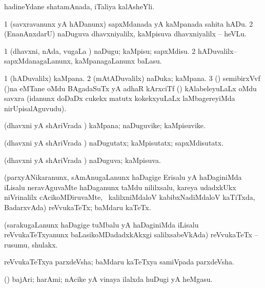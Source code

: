 \bentry
{}
\gl{\nA}
\bmng
hadineYdane shatamAnada, iTaliya kalAsheYli. 
\emng
\eentry

\bentry
{}
\gl{\sakirx}
\bmng
\bnum
\num{1} (savxravanunx yA hADanunx) sapxMdanada yA kaMpanada sahita hADu. 
\num{2} (EnanAnxdarU) naDuguva dhavxniyalilx, kaMpisuva dhavxniyalilx -- heVLu. 
\enum
\emng

\noindent
\gl{\akirx}
\bmng
\bnum
\num{1} (dhavxni, nAda, \mo vugaLa \vi) naDugu; kaMpisu; sapxMdisu. 
\num{2} hADuvalilx--sapxMdanagaLanunx, kaMpanagaLanunx baLasu. 
\enum
\emng
\eentry

\bentry
{}
\gl{\nA}
\bmng
\bnum
\num{1} (hADuvalilx) kaMpana. 
\num{2} (mAtADuvalilx) naDuka; kaMpana. 
\num{3} (\saM) semibirxVvf ()na eMTane oMdu BAgadaSuTx yA adhaR kArxciTf () kAlabeleyuLaLx oMdu savxra (idanunx doDaDx cukekx matutx kokekxyuLaLx laMbagereyiMda nirUpisalAguvudu). 
\enum
\emng
\eentry

\bentry
{}
\gl{\nA}
\bmng
(dhavxni yA shAriVrada \vi) kaMpana; naDuguvike; kaMpi\-suvike. 
\emng
\eentry

\bentry
{}
\gl{\kirxvi}
\bmng
(dhavxni yA shAriVrada \vi) naDugutatx; kaMpi\-sutatx; sapxMdisutatx. 
\emng
\eentry

\bentry
{}
\gl{\gu}
\bmng
(dhavxni yA shAriVrada \vi) naDuguva; kaMpisuva. 
\emng
\eentry

\bentry
{}
\gl{\nA}
\bmng
(parxyANikaranunx, sAmAnugaLanunx haDagige Erisalu yA haDaginiMda iLisalu neravAguvaMte haDaganunx taMdu nililxsalu, kareya udadxkUkx niVrinalilx cAcikoMDiruvaMte, \sA\ kalilxniMdaloV kabibxNadiMdaloV kaTiTxda, BadarxvAda) reVvukaTeTx; baMdaru kaTeTx. 
\emng
\eentry

\bentry
{}
\gl{\nA}
\bmng
(sarakugaLanunx haDagige tuMbalu yA haDaginiMda iLisalu reVvukaTeTxyanunx baLasikoMDadadxkAkxgi salilxsabeVkAda) reVvukaTeTx -- rusumu, shulakx. 
\emng
\eentry

\bentry
{}
\gl{\nA}
\bmng
reVvukaTeTxya parxdeVsha; baMdaru kaTeTxya samiVpada parxdeVsha. 
\emng
\eentry

\bentry
{}
\gl{\saMkiSx}
\bmng
{} 
\emng
\eentry

\bentry
{} 
\gl{\nA}({\pArxparx}) 
\bmng
bajAri; harAmi; nAcike yA vinaya ilalxda huDugi yA heMgasu. 
\emng
\eentry

